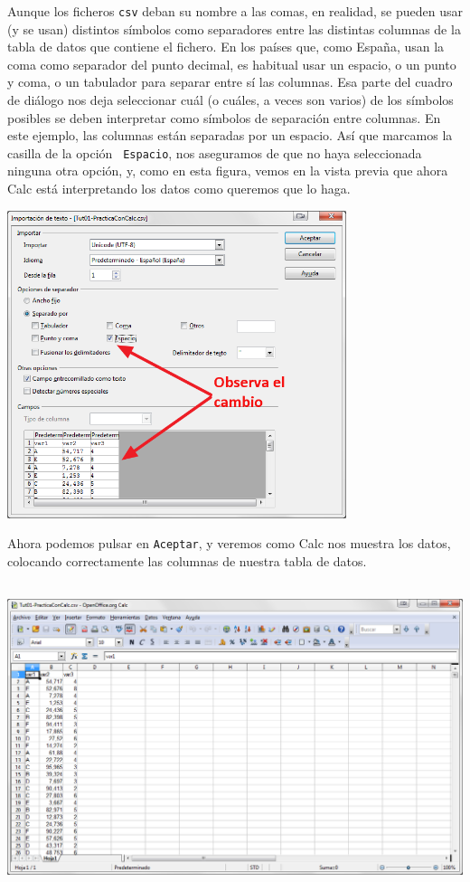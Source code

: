 \documentclass[10pt,a4paper]{article}\usepackage[]{graphicx}\usepackage[]{color}
\newcounter {cont01}
\begin{document}
Aunque los ficheros {\tt csv} deban su nombre a las comas, en realidad, se pueden usar (y se usan)
distintos símbolos como {\sf separadores} entre las distintas columnas de la tabla de datos que
contiene el fichero. En los países que, como España, usan la coma como separador del punto decimal,
es habitual usar un espacio, o un punto y coma, o un tabulador para separar entre sí las columnas.
Esa parte del cuadro de diálogo nos deja seleccionar cuál (o cuáles, a veces son varios) de los
símbolos posibles se deben interpretar como símbolos de separación entre columnas. En este ejemplo,
las columnas están separadas por un espacio. Así que marcamos la casilla de la opción {\tt
Espacio}, nos aseguramos de que no haya seleccionada ninguna otra opción, y,  como en esta figura,
vemos en la vista previa que ahora Calc está interpretando los datos como queremos que lo haga.
        \begin{center}
        \includegraphics[height=9cm]{../fig/Tut00-Calc-csv-03.png}
        \end{center}
        Ahora podemos pulsar en {\tt Aceptar}, y veremos como Calc nos muestra los datos, colocando correctamente las columnas de nuestra tabla de datos.
        \begin{center}
        \includegraphics[height=9cm]{../fig/Tut00-Calc-csv-04.png}
        \end{center}
\end{document}
